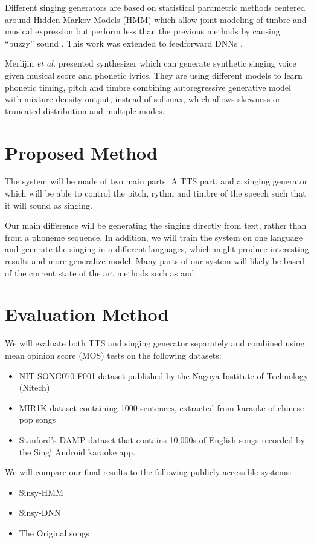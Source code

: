 \documentclass[11pt]{article}
\begin{document}
Different singing generators are based on statistical parametric methods centered around Hidden Markov Models (HMM) which allow joint modeling of timbre and musical expression but perform less than the previous methods by causing “buzzy” sound \cite{oura2012pitch}.
This work was extended to feedforward DNNs \cite{nishimura2016singing}.

Merlijin {\em et al.} \cite{blaauw2017neural} presented synthesizer which can generate synthetic singing voice given musical score and phonetic lyrics. They are using different models to learn phonetic timing, pitch and timbre combining autoregressive generative model with mixture density output, instead of softmax, which allows skewness or truncated distribution and multiple modes.

\section{Proposed Method}

The system will be made of two main parts: A TTS part,
and a singing generator which will be able to control
the pitch, rythm and timbre of the speech such that it will sound as singing.

Our main difference will be generating the singing directly from text, rather than from a phoneme sequence.
In addition, we will train the system on one language and generate the singing in a different languages, which might produce interesting results and more generalize model.
Many parts of our system will likely be based of the current state of the art methods such as \cite{blaauw2017neural} and \cite{wang2017tacotron}

\section{Evaluation Method}
We will evaluate both TTS and singing generator separately and combined using mean opinion score (MOS) tests on the following datasets: 
\begin{itemize}
	\item NIT-SONG070-F001 dataset published by the Nagoya Institute of Technology (Nitech)
	\item MIR1K dataset containing 1000 sentences, extracted from karaoke of chinese pop songs
	\item Stanford's DAMP dataset that contains 10,000s of English songs recorded by the Sing! Android karaoke app. 
\end{itemize}
We will compare our final results to the following publicly accessible systems:
\begin{itemize}
	\item Sinsy-HMM \cite{oura2012pitch}
	\item Sinsy-DNN \cite{nishimura2016singing}
	\item The Original songs
\end{itemize}



\end{document}
